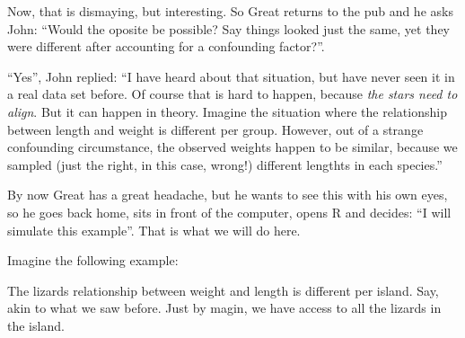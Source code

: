 \documentclass[
]{book}
\begin{document}
Now, that is dismaying, but interesting. So Great returns to the pub and he asks John: ``Would the oposite be possible? Say things looked just the same, yet they were different after accounting for a confounding factor?''.

``Yes'', John replied: ``I have heard about that situation, but have never seen it in a real data set before. Of course that is hard to happen, because \emph{the stars need to align}. But it can happen in theory. Imagine the situation where the relationship between length and weight is different per group. However, out of a strange confounding circumstance, the observed weights happen to be similar, because we sampled (just the right, in this case, wrong!) different lengthts in each species.''

By now Great has a great headache, but he wants to see this with his own eyes, so he goes back home, sits in front of the computer, opens R and decides: ``I will simulate this example''. That is what we will do here.

Imagine the following example:

The lizards relationship between weight and length is different per island. Say, akin to what we saw before. Just by magin, we have access to all the lizards in the island.
\end{document}
